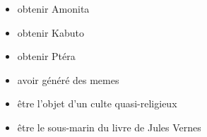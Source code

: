 \documentclass[11pt,a4paper]{article}
\begin{document}
\begin{table}[ht!]
  \centering
  \begin{minipage}{0.40\textwidth}
    \centering
\begin{itemize}
  \item[\CaseCoche] obtenir Amonita \phantom{()} \\
  \item[\CaseCoche] obtenir Kabuto  \phantom{()}\\
  \item[\CaseCoche] obtenir Ptéra \\
\end{itemize}
  \end{minipage}
  \hfillx
  \begin{minipage}{0.50\textwidth}
    \centering
\begin{itemize}
  \item[\CaseCoche] avoir généré des memes \phantom{()} \\
  \item[\CaseCoche] être l'objet d'un culte quasi-religieux \phantom{()} \\
  \item[\CaseCoche] être le sous-marin du livre de Jules Vernes \\
\end{itemize}
  \end{minipage}
\end{table}

\vfillLast
\end{document}
